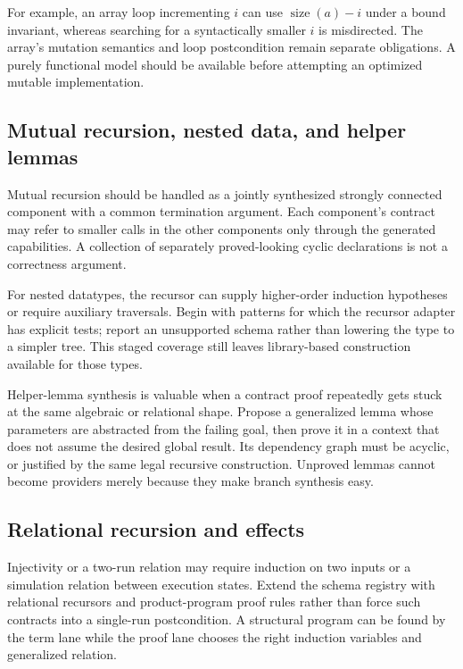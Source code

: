 For example, an array loop incrementing $i$ can use $\operatorname{size}(a)-i$
under a bound invariant, whereas searching for a syntactically smaller $i$ is
misdirected. The array's mutation semantics and loop postcondition remain
separate obligations. A purely functional model should be available before
attempting an optimized mutable implementation.

\subsection{Mutual recursion, nested data, and helper lemmas}

Mutual recursion should be handled as a jointly synthesized strongly connected
component with a common termination argument. Each component's contract may
refer to smaller calls in the other components only through the generated
capabilities. A collection of separately proved-looking cyclic declarations is
not a correctness argument.

For nested datatypes, the recursor can supply higher-order induction hypotheses
or require auxiliary traversals. Begin with patterns for which the recursor
adapter has explicit tests; report an unsupported schema rather than lowering
the type to a simpler tree. This staged coverage still leaves library-based
construction available for those types.

Helper-lemma synthesis is valuable when a contract proof repeatedly gets stuck
at the same algebraic or relational shape. Propose a generalized lemma whose
parameters are abstracted from the failing goal, then prove it in a context
that does not assume the desired global result. Its dependency graph must be
acyclic, or justified by the same legal recursive construction. Unproved
lemmas cannot become providers merely because they make branch synthesis easy.

\subsection{Relational recursion and effects}

Injectivity or a two-run relation may require induction on two inputs or a
simulation relation between execution states. Extend the schema registry with
relational recursors and product-program proof rules rather than force such
contracts into a single-run postcondition. A structural program can be found
by the term lane while the proof lane chooses the right induction variables
and generalized relation.

